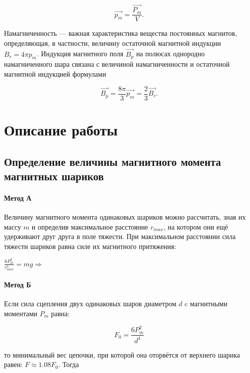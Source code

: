 \documentclass[a4paper,12pt]{article}
\begin{document}
\begin{equation}
\overrightarrow{p_m}=\frac{\overrightarrow{P_m}}{V}.
\end{equation}

Намагниченность — важная характеристика вещества постоянных магнитов, определяющая, в
частности, величину остаточной магнитной индукции $B_r = 4\pi p_m$. Индукция магнитного поля $\overrightarrow{B_p}$
на полюсах однородно намагниченного шара связана с величиной намагниченности и остаточной магнитной индукцией формулами

\begin{equation}
\overrightarrow{B_p}=\frac{8\pi}{3}\overrightarrow{p_m}=\frac{2}{3}\overrightarrow{B_r}.
\end{equation}

\section*{Описание работы}
\subsection*{Определение величины магнитного момента магнитных шариков}
\paragraph*{Метод А}
Величину магнитного момента одинаковых шариков
можно рассчитать, зная их массу $m$ и определив максимальное расстояние $r_{max}$, на котором они ещё удерживают друг
друга в поле тяжести. При максимальном расстоянии сила тяжести шариков равна силе их магнитного притяжения:
\begin{center}
$\frac{6P_m^2}{r_{max}^4}=mg\Rightarrow$ 
\end{center}
\paragraph*{Метод Б}
Если сила сцепления двух одинаковых шаров диаметром $d$ c магнитными моментами $P_m$ равна:

\begin{equation}
F_0 = \frac{6P_m^2}{d^4}
\end{equation}

то минимальный вес цепочки, при которой она оторвётся от верхнего шарика равен: $F \approx 1.08 F_0$. Тогда\\
\begin{center}
\end{center}
\end{document}
